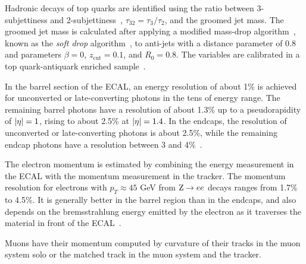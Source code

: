 Hadronic decays of top quarks are identified using the ratio between 3-subjettiness and 2-subjettiness~\cite{Thaler:2010tr}, $\tau_{32}=\tau_{3}/\tau_{2}$, and the groomed jet mass. The groomed jet mass is calculated after applying a modified mass-drop algorithm~\cite{Dasgupta:2013ihk,Butterworth:2008iy}, known as the \emph{soft drop} algorithm~\cite{Larkoski:2014wba}, to anti-\kt jets with a distance parameter of 0.8 and parameters $\beta=0$, $z_\text{cut}=0.1$, and $R_0 = 0.8$. The variables are calibrated in a top quark-antiquark enriched sample~\cite{Sirunyan:2020foa}.

In the barrel section of the ECAL, an energy resolution of about 1\% is achieved for unconverted or late-converting photons in the tens of \GeV energy range. The remaining barrel photons have a resolution of about 1.3\% up to a pseudorapidity of $\lvert \eta \rvert = 1$, rising to about 2.5\% at $\lvert \eta \rvert = 1.4$. In the endcaps, the resolution of unconverted or late-converting photons is about 2.5\%, while the remaining endcap photons have a resolution between 3 and 4\%~\cite{CMS:EGM-14-001}.

The electron momentum is estimated by combining the energy measurement in the ECAL with the momentum measurement in the tracker. The momentum resolution for electrons with $p_T \approx 45$ GeV from $\mathrm{Z} \rightarrow ee$ decays ranges from 1.7\% to 4.5\%. It is generally better in the barrel region than in the endcaps, and also depends on the bremsstrahlung energy emitted by the electron as it traverses the material in front of the ECAL~\cite{Khachatryan:2015hwa}.

Muons have their momentum computed by curvature of their tracks in the muon system solo or the matched track in the muon system and the tracker.